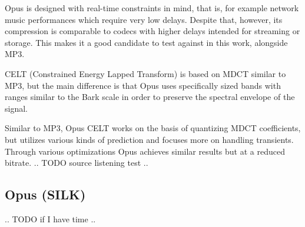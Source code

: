 Opus is designed with real-time constraints in mind, that is, for example network music performances which require very low delays. Despite that, however, its compression is comparable to codecs with higher delays intended for streaming or storage. This makes it a good candidate to test against in this work, alongside MP3.

CELT (Constrained Energy Lapped Transform) is based on MDCT similar to MP3, but the main difference is that Opus uses specifically sized bands with ranges similar to the Bark scale in order to preserve the spectral envelope of the signal.

Similar to MP3, Opus CELT works on the basis of quantizing MDCT coefficients, but utilizes various kinds of prediction and focuses more on handling transients. Through various optimizations Opus achieves similar results but at a reduced bitrate.
.. TODO source listening test ..

\subsection{Opus (SILK)}
.. TODO if I have time ..
